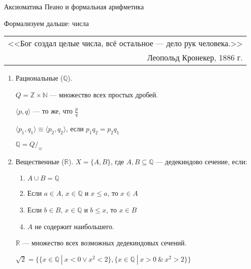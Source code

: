 \documentclass[handout]{beamer}
\begin{document}
\begin{frame}
\begin{center}{\LARGE Аксиоматика Пеано и формальная арифметика}\end{center}

\end{frame}


\begin{frame}{Формализуем дальше: числа}

{\itshape \hfill \begin{tabular}{r} <<Бог создал целые числа, всё остальное — дело рук человека.>>\\
                                 Леопольд Кронекер, 1886 г.\end{tabular}}\pause
\begin{enumerate}
\item Рациональные ($\mathbb{Q}$).\pause

      $Q = \mathbb{Z} \times \mathbb{N}$ --- множество всех простых дробей.\pause

      $\langle p,q \rangle$ --- то же, что $\frac{p}{q}$ \pause

      $\langle p_1,q_1 \rangle \equiv \langle p_2, q_2 \rangle$, если $p_1q_2 = p_2q_1$\pause

\vspace{0.1cm}
      $\mathbb{Q} = Q/_\equiv$

\item Вещественные ($\mathbb{R}$). \pause $X = \{ A, B \}$, где $A,B \subseteq \mathbb{Q}$ --- дедекиндово сечение, если:\pause
\begin{enumerate}
\item $A\cup B = \mathbb{Q}$\pause
\item Если $a \in A$, $x \in \mathbb{Q}$ и $x \le a$, то $x \in A$\pause
\item Если $b \in B$, $x \in \mathbb{Q}$ и $b \le x$, то $x \in B$\pause
\item $A$ не содержит наибольшего.\pause
\end{enumerate}

       $\mathbb{R}$ --- множество всех возможных дедекиндовых сечений. \pause

$\sqrt 2 = \{\{ x\in\mathbb{Q}\ |\ x < 0 \vee x^2 < 2 \}, \{ x\in\mathbb{Q}\ |\ x > 0 \ \& \ x^2 > 2\}\}$
\end{enumerate}
\end{frame}
\end{document}
